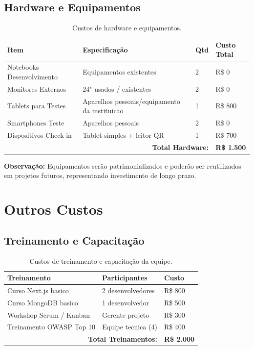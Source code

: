 \subsection{Hardware e Equipamentos}

\begin{table}[H]
\centering
\caption{Custos de hardware e equipamentos.}%
\label{tab:hardware}
\small
\begin{tabular}{|p{4cm}|p{3cm}|p{2cm}|p{3cm}|}
\hline
\textbf{Item} & \textbf{Especificação} & \textbf{Qtd} & \textbf{Custo Total} \\ \hline
Notebooks Desenvolvimento & Equipamentos existentes & 2 & R\$ 0 \\ \hline
Monitores Externos & 24" usados / existentes & 2 & R\$ 0 \\ \hline
Tablets para Testes & Aparelhos pessoais/equipamento da instituicao & 1 & R\$ 800 \\ \hline
Smartphones Teste & Aparelhos pessoais & 2 & R\$ 0 \\ \hline
Dispositivos Check-in & Tablet simples + leitor QR & 1 & R\$ 700 \\ \hline
\multicolumn{3}{|r|}{\textbf{Total Hardware:}} & \textbf{R\$ 1.500} \\ \hline
\end{tabular}
\end{table}

\textbf{Observação:} Equipamentos serão patrimonializados e poderão ser reutilizados em projetos futuros, representando investimento de longo prazo.

\section{Outros Custos}

\subsection{Treinamento e Capacitação}

\begin{table}[H]
\centering
\caption{Custos de treinamento e capacitação da equipe.}%
\label{tab:treinamento}
\small
\begin{tabular}{|p{5cm}|p{3cm}|p{4cm}|}
\hline
\textbf{Treinamento} & \textbf{Participantes} & \textbf{Custo} \\ \hline
Curso Next.js basico & 2 desenvolvedores & R\$ 800 \\ \hline
Curso MongoDB basico & 1 desenvolvedor & R\$ 500 \\ \hline
Workshop Scrum / Kanban & Gerente projeto & R\$ 300 \\ \hline
Treinamento OWASP Top 10 & Equipe tecnica (4) & R\$ 400 \\ \hline
\multicolumn{2}{|r|}{\textbf{Total Treinamentos:}} & \textbf{R\$ 2.000} \\ \hline
\end{tabular}
\end{table}

